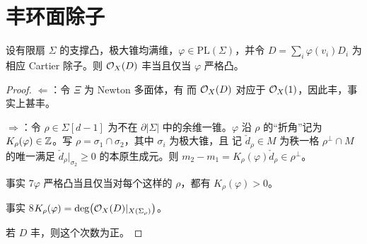 \section{丰环面除子}
\begin{proposition}\label{prop:4.20}
设有限扇 $\Sigma$ 的支撑凸，极大锥均满维，$\varphi\in\mathrm{PL}(\Sigma)$，并令 $D=\sum_i\varphi(v_i)D_i$ 为相应 Cartier 除子。则 $\mathcal O_X(D)$ 丰当且仅当 $\varphi$ 严格凸。
\end{proposition}
\begin{proof}
$\Leftarrow$：令 $\Xi$ 为 Newton 多面体，有
而 $\mathcal O_X(D)$ 对应于 $\mathcal O_X(1)$，因此丰，事实上甚丰。

$\Rightarrow$：令 $\rho\in\Sigma[d-1]$ 为不在 $\partial|\Sigma|$ 中的余维一锥。$\varphi$ 沿 $\rho$ 的“折角”记为 $K_\rho(\varphi)\in\mathbb Z$。写 $\rho=\sigma_1\cap\sigma_2$，其中 $\sigma_i$ 为极大锥，且
记 $\check d_\rho\in M$ 为秩一格 $\rho^\perp\cap M$ 的唯一满足 $\check d_\rho|_{\sigma_2}\ge0$ 的本原生成元。则 $m_2-m_1=K_\rho(\varphi)\check d_\rho\in\rho^\perp$。
\begin{custom}{事实 7}\hypertarget{fact:7}{}$\varphi$ 严格凸当且仅当对每个这样的 $\rho$，都有 $K_\rho(\varphi)>0$。\end{custom}
\begin{custom}{事实 8}\hypertarget{fact:8}{}$K_\rho(\varphi)=\deg\bigl(\mathcal O_X(D)|_{X(\Sigma_\rho)}\bigr)$。\end{custom}
若 $D$ 丰，则这个次数为正。
\end{proof}
